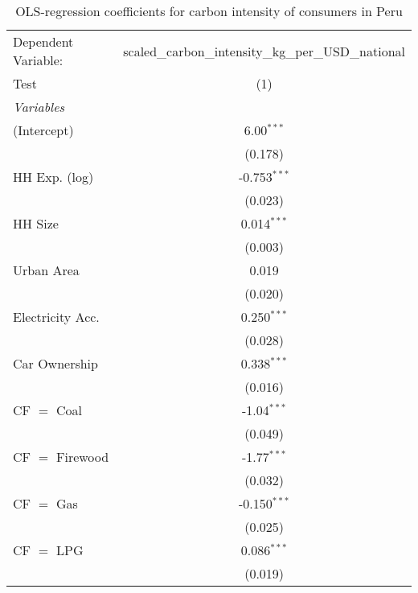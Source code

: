 
\begin{table}[htbp!]
   \centering
   \small
   \begin{adjustbox}{width = 1\textwidth, max height = 0.95\textheight, center}
      \begin{threeparttable}[b]
         \caption{\label{tab:OLS_1_PER} OLS-regression coefficients for carbon intensity of consumers in Peru}
         \begin{tabular}{lc}
            \tabularnewline \midrule \midrule
            Dependent Variable: & scaled\_carbon\_intensity\_kg\_per\_USD\_national\\        
            Test                & (1)\\  
            \midrule
            \emph{Variables}\\
            (Intercept)         & 6.00$^{***}$\\   
                                & (0.178)\\   
            HH Exp. (log)       & -0.753$^{***}$\\   
                                & (0.023)\\   
            HH Size             & 0.014$^{***}$\\   
                                & (0.003)\\   
            Urban Area          & 0.019\\   
                                & (0.020)\\   
            Electricity Acc.    & 0.250$^{***}$\\   
                                & (0.028)\\   
            Car Ownership       & 0.338$^{***}$\\   
                                & (0.016)\\   
            CF $=$ Coal         & -1.04$^{***}$\\   
                                & (0.049)\\   
            CF $=$ Firewood     & -1.77$^{***}$\\   
                                & (0.032)\\   
            CF $=$ Gas          & -0.150$^{***}$\\   
                                & (0.025)\\   
            CF $=$ LPG          & 0.086$^{***}$\\   
                                & (0.019)\\   

\end{tabular}
\end{threeparttable}
\end{adjustbox}
\end{table}
